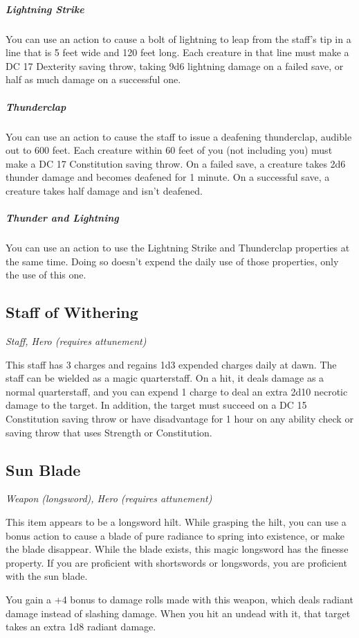 \subparagraph*{Lightning Strike} You can use an action to cause a bolt of lightning to leap from the staff's tip in a line that is 5 feet wide and 120 feet long. Each creature in that line must make a DC 17 Dexterity saving throw, taking 9d6 lightning damage on a failed save, or half as much damage on a successful one.

\subparagraph*{Thunderclap} You can use an action to cause the staff to issue a deafening thunderclap, audible out to 600 feet. Each creature within 60 feet of you (not including you) must make a DC 17 Constitution saving throw. On a failed save, a creature takes 2d6 thunder damage and becomes deafened for 1 minute. On a successful save, a creature takes half damage and isn't deafened.

\subparagraph*{Thunder and Lightning} You can use an action to use the Lightning Strike and Thunderclap properties at the same time. Doing so doesn't expend the daily use of those properties, only the use of this one.

\subsection{Staff of Withering}
\textit{Staff, Hero (requires attunement)} 

This staff has 3 charges and regains 1d3 expended charges daily at dawn. The staff can be wielded as a magic quarterstaff. On a hit, it deals damage as a normal quarterstaff, and you can expend 1 charge to deal an extra 2d10 necrotic damage to the target. In addition, the target must succeed on a DC 15 Constitution saving throw or have disadvantage for 1 hour on any ability check or saving throw that uses Strength or Constitution.

\subsection{Sun Blade}
\textit{Weapon (longsword), Hero (requires attunement)}

This item appears to be a longsword hilt. While grasping the hilt, you can use a bonus action to cause a blade of pure radiance to spring into existence, or make the blade disappear. While the blade exists, this magic longsword has the finesse property. If you are proficient with shortswords or longswords, you are proficient with the sun blade.

You gain a +4 bonus to damage rolls made with this weapon, which deals radiant damage instead of slashing damage. When you hit an undead with it, that target takes an extra 1d8 radiant damage.

